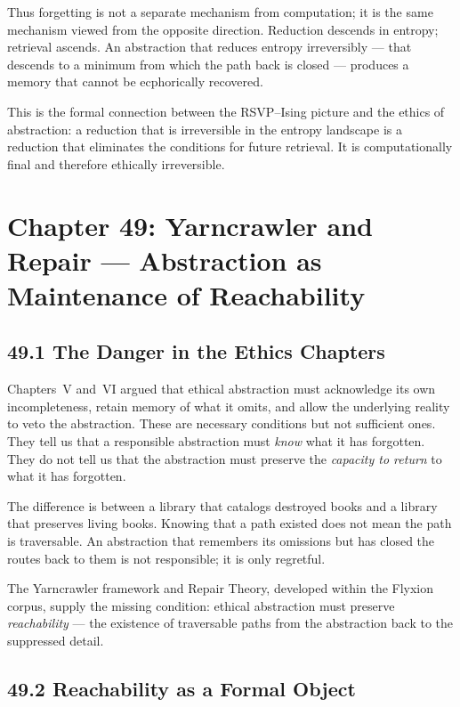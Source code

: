 \documentclass[12pt,letterpaper]{article}
\theoremstyle{remark}
\begin{document}
Thus forgetting is not a separate mechanism from computation; it is
the same mechanism viewed from the opposite direction. Reduction
descends in entropy; retrieval ascends. An abstraction that reduces
entropy irreversibly — that descends to a minimum from which the
path back is closed — produces a memory that cannot be ecphorically
recovered.

This is the formal connection between the RSVP--Ising picture and
the ethics of abstraction: a reduction that is irreversible in
the entropy landscape is a reduction that eliminates the conditions
for future retrieval. It is computationally final and therefore
ethically irreversible.

\newpage
\section{Chapter 49: Yarncrawler and Repair —
Abstraction as Maintenance of Reachability}

\subsection{49.1 The Danger in the Ethics Chapters}

Chapters~V and~VI argued that ethical abstraction must acknowledge
its own incompleteness, retain memory of what it omits, and allow
the underlying reality to veto the abstraction. These are necessary
conditions but not sufficient ones. They tell us that a responsible
abstraction must \emph{know} what it has forgotten. They do not
tell us that the abstraction must preserve the \emph{capacity to
return} to what it has forgotten.

The difference is between a library that catalogs destroyed books
and a library that preserves living books. Knowing that a path
existed does not mean the path is traversable. An abstraction that
remembers its omissions but has closed the routes back to them is
not responsible; it is only regretful.

The Yarncrawler framework and Repair Theory, developed within the
Flyxion corpus, supply the missing condition: ethical abstraction
must preserve \emph{reachability} — the existence of traversable
paths from the abstraction back to the suppressed detail.

\subsection{49.2 Reachability as a Formal Object}
\end{document}
